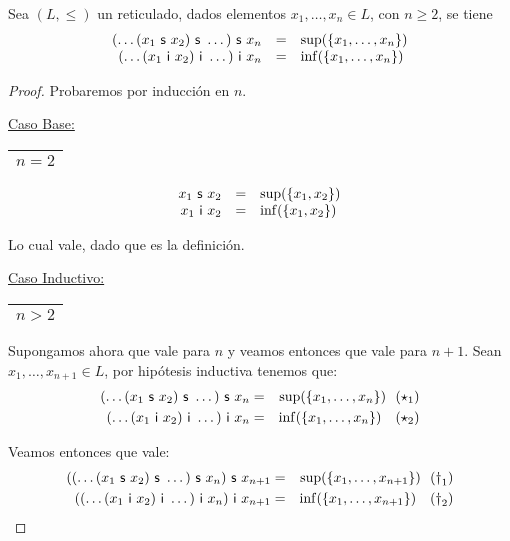 
  \begin{lemma} \label{lemma_3}
    \PN Sea $(L, \leq)$ un reticulado, dados elementos $x_{1}, \dotsc, x_{n} \in L$, con $n \geq 2$, se tiene
    \[
      \begin{array}{rcl}
        (\dotsc (x_{1} \ \mathsf{s} \ x_{2}) \ \mathsf{s} \ \dotsc) \ \mathsf{s} \ x_{n} &=& \sup (\{x_{1}, \dotsc, x_{n}\}) \\
        (\dotsc (x_{1} \ \mathsf{i} \ x_{2}) \ \mathsf{i} \ \dotsc) \ \mathsf{i} \ x_{n} &=& \inf (\{x_{1}, \dotsc, x_{n}\})
      \end{array}
    \]
  \end{lemma}
  \begin{proof}
    \PN Probaremos por inducción en $n$.

    \vspace{3mm}
    \PN \underline{Caso Base:} \begin{tabular}{|c|} \hline $n = 2$ \\\hline \end{tabular}
    \[
      \begin{array}{rcl}
        x_{1} \ \mathsf{s} \ x_{2} &=& \sup(\{x_{1}, x_{2}\}) \\
        x_{1} \ \mathsf{i} \ x_{2} &=& \inf(\{x_{1}, x_{2}\})
      \end{array}
    \]

    \PN Lo cual vale, dado que es la definición.

    \vspace{3mm}
		\PN \underline{Caso Inductivo:} \begin{tabular}{|c|} \hline $n > 2$ \\\hline \end{tabular}

    \PN Supongamos ahora que vale para $n$ y veamos entonces que vale para $n+1$. Sean $x_{1}, \dotsc, x_{n+1} \in L$,
    por hipótesis inductiva tenemos que:
    \begin{eqnarray*}
      (\dotsc (x_{1} \ \mathsf{s} \ x_{2}) \ \mathsf{s} \ \dotsc) \ \mathsf{s} \ x_{n} &=& \sup(\{x_{1}, \dotsc, x_{n}\}) \ \ (\star_{1}) \\
      (\dotsc (x_{1} \ \mathsf{i} \ x_{2}) \ \mathsf{i} \ \dotsc) \ \mathsf{i} \ x_{n} &=& \inf(\{x_{1}, \dotsc, x_{n}\}) \ \ \ (\star_{2})
    \end{eqnarray*}


    \PN Veamos entonces que vale:
    \begin{eqnarray*}
      ((\dotsc(x_{1} \ \mathsf{s} \ x_{2}) \ \mathsf{s} \ \dotsc) \ \mathsf{s} \ x_{n}) \ \mathsf{s} \ x_{n+1} &=& \sup(\{x_{1}, \dotsc, x_{n+1}\})
        \ \ (\dag_{1}) \\
      ((\dotsc(x_{1} \ \mathsf{i} \ x_{2}) \ \mathsf{i} \ \dotsc) \ \mathsf{i} \ x_{n}) \ \mathsf{i} \ x_{n+1} &=& \inf(\{x_{1}, \dotsc, x_{n+1}\})
        \ \ \ (\dag_{2})
    \end{eqnarray*}


\end{proof}
